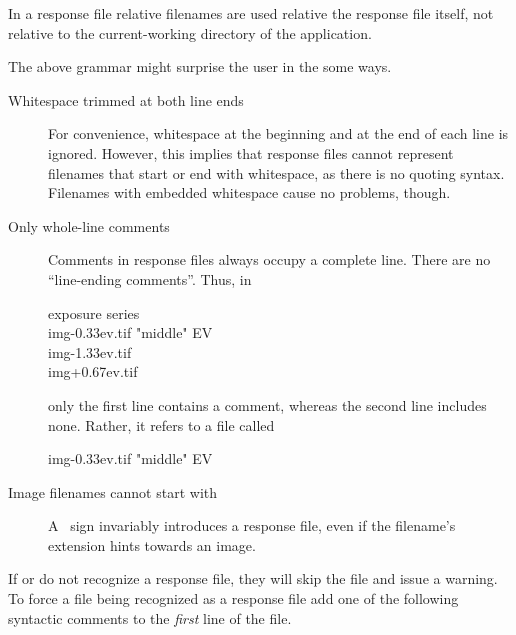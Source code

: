 In a response file relative filenames are used relative the response file itself, not relative
to the current-working directory of the application.

The above grammar might surprise the user in the some ways.

\begin{description}
\item[Whitespace trimmed at both line ends]\itemend
  For convenience, whitespace at the beginning and at the end of each line is ignored.  However,
  this implies that response files cannot represent filenames that start or end with whitespace,
  as there is no quoting syntax.  Filenames with embedded whitespace cause no problems, though.

\item[Only whole-line comments]\itemend
  Comments in response files always occupy a complete line.  There are no ``line-ending
  comments''.  Thus, in

  \begin{literal}
     exposure series \\
    img-0.33ev.tif  "middle" EV \\
    img-1.33ev.tif \\
    img+0.67ev.tif \\
  \end{literal}

  only the first line contains a comment, whereas the second line includes none.  Rather, it
  refers to a file called

  \begin{literal}
    img-0.33ev.tif  "middle" EV
  \end{literal}

\item[Image filenames cannot start with ]\itemend
  A ~sign invariably introduces a response file, even
  if the filename's extension hints towards an image.
\end{description}

If  or  do
not recognize a response file, they will skip the file and issue a warning.  To force a file
being recognized as a response file add one of the following syntactic comments to the
\emph{first} line of the file.

